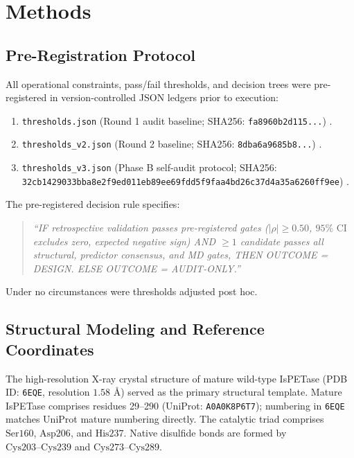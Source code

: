 \documentclass[10pt,twocolumn]{article}
\begin{document}
\section{Methods}

\subsection{Pre-Registration Protocol}
All operational constraints, pass/fail thresholds, and decision trees were pre-registered in version-controlled JSON ledgers prior to execution:
\begin{enumerate}
    \item \texttt{thresholds.json} (Round 1 audit baseline; SHA256: \texttt{fa8960b2d115...}) \cite{repo}.
    \item \texttt{thresholds\_v2.json} (Round 2 baseline; SHA256: \texttt{8dba6a9685b8...}) \cite{repo}.
    \item \texttt{thresholds\_v3.json} (Phase B self-audit protocol; SHA256: \texttt{32cb1429033bba8e2f9ed011eb89ee69fdd5f9faa4bd26c37d4a35a6260ff9ee}) \cite{repo}.
\end{enumerate}
The pre-registered decision rule specifies:
\begin{quote}
\textit{``IF retrospective validation passes pre-registered gates ($|\rho| \geq 0.50$, $95\%\text{ CI}$ excludes zero, expected negative sign) AND $\geq 1$ candidate passes all structural, predictor consensus, and MD gates, THEN OUTCOME = DESIGN. ELSE OUTCOME = AUDIT-ONLY.''}
\end{quote}
Under no circumstances were thresholds adjusted post hoc.

\subsection{Structural Modeling and Reference Coordinates}
The high-resolution X-ray crystal structure of mature wild-type IsPETase (PDB ID: \texttt{6EQE}, resolution $1.58\text{ \AA}$) \cite{austin2018characterization} served as the primary structural template. Mature IsPETase comprises residues 29–290 (UniProt: \texttt{A0A0K8P6T7}); numbering in \texttt{6EQE} matches UniProt mature numbering directly. The catalytic triad comprises $\text{Ser160}$, $\text{Asp206}$, and $\text{His237}$. Native disulfide bonds are formed by $\text{Cys203}\text{--}\text{Cys239}$ and $\text{Cys273}\text{--}\text{Cys289}$.
\end{document}
